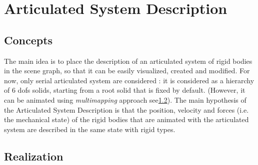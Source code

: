 \section{Articulated System Description}


\subsection{Concepts}

The main idea is to place the description of an articulated system of rigid bodies in the scene graph, so that it can be easily visualized, created and modified. For now, only serial articulated system are considered : it is considered as a hierarchy of 6 dofs solids, starting from a root solid that is fixed by default. (However, it can be animated using \textit{multimapping} approach see\ref{}).
\newline
\newline
The main hypothesis of the Articulated System Description is that the position, velocity and forces (i.e. the mechanical state) of the rigid bodies that are animated with the articulated system are described in the same state with rigid types.

\subsection{Realization}

